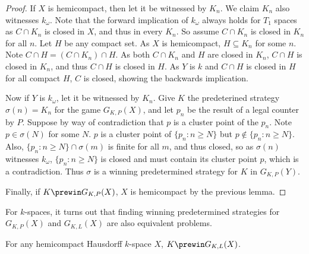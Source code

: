 \begin{proof}
If $X$ is hemicompact, then let it be witnessed by $K_n$. We claim $K_n$ also witnesses $k_\omega$. Note that the forward implication of $k_\omega$ always holds for $T_1$ spaces as $C\cap K_n$ is closed in $X$, and thus in every $K_n$. So assume $C\cap K_n$ is closed in $K_n$ for all $n$. Let $H$ be any compact set. As $X$ is hemicompact, $H\subseteq K_n$ for some $n$. Note $C\cap H = (C\cap K_n)\cap H$. As both $C \cap K_n$ and $H$ are closed in $K_n$, $C\cap H$ is closed in $K_n$, and thus $C\cap H$ is closed in $H$. As $Y$ is $k$ and $C\cap H$ is closed in $H$ for all compact $H$, $C$ is closed, showing the backwards implication.

Now if $Y$ is $k_\omega$, let it be witnessed by $K_n$. Give $K$ the predeterined strategy $\sigma(n)=K_n$ for the game $G_{K,P}(X)$, and let $p_n$ be the result of a legal counter by $P$. Suppose by way of contradiction that $p$ is a cluster point of the $p_n$. Note $p\in \sigma(N)$ for some $N$. $p$ is a cluster point of $\{p_n : n\geq N\}$ but $p\not\in \{p_n : n \geq N\}$. Also, $\{p_n : n \geq N\} \cap \sigma(m)$ is finite for all $m$, and thus closed, so as $\sigma(n)$ witnesses $k_\omega$, $\{p_n : n\geq N\}$ is closed and must contain its cluster point $p$, which is a contradiction. Thus $\sigma$ is a winning predetermined strategy for $K$ in $G_{K,P}(Y)$.

Finally, if $K \prewin G_{K,P}(X)$, $X$ is hemicompact by the previous lemma.
\end{proof}

For $k$-spaces, it turns out that finding winning predetermined strategies for $G_{K,P}(X)$ and $G_{K,L}(X)$ are also equivalent problems.

\begin{thm}
For any hemicompact Hausdorff $k$-space $X$, $K \prewin G_{K,L}(X)$.
\end{thm}

